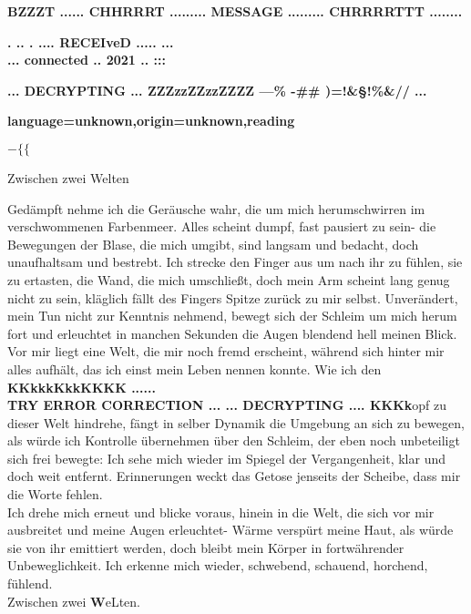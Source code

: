 \textbf{
    BZZZT ...... CHHRRRT ......... MESSAGE ......... CHRRRRTTT ........
}

\begin{center}
    \Large \textbf{. .. . .... RECEIveD ..... ...}\\
    \hspace{4cm}\small\textbf{... connected .. 2021 .. :::}
\end{center}
{\Large\textbf{... DECRYPTING ... ZZZzzZZzzZZZZ ---\% -## )=!&§!\%\&// ...}}

{\hspace{6cm}\small\textbf{language=unknown,origin=unknown,reading}}


{
    \hspace{-1.5cm}\Huge $-\{\{$
}
\begin{center}
    \huge\color{orange} Zwi\color{black}sche\color{orange}n zwei \color{red}W\color{black!70}e\color{black!60}l\color{black!50}t\color{black!30}e\color{black!10}n \color{black}
\end{center}
{

\itshape

\color{black!10}G\color{black!30}e\color{black!50}d\color{black!60}ä\color{black!70}m\color{black!80}p\color{black!90}f\color{black}t nehme ich die Geräusche wahr, die um mich herumschwirren im verschwommenen Farbenmeer. Alles scheint dumpf, fast pausiert zu sein- die Bewegungen der Blase, die mich umgibt, sind langsam und bedacht, doch unaufhaltsam und bestrebt. Ich strecke den Finger aus um nach ihr zu fühlen, sie zu ertasten, die Wand, die mich umschließt, doch mein Arm scheint lang genug nicht zu sein, kläglich fällt des Fingers Spitze zurück zu mir selbst. Unverändert, mein Tun nicht zur Kenntnis nehmend, bewegt sich der Schleim um mich herum fort und erleuchtet in manchen Sekunden die Augen blendend hell meinen Blick.  Vor mir liegt eine Welt, die mir noch fremd erscheint, während sich hinter mir alles aufhält, das ich einst mein Leben nennen konnte. Wie ich den {\normalfont\textbf{KKkkkKkkKKKK ...... }}\\

{\normalfont\textbf{TRY ERROR CORRECTION ... ...  DECRYPTING .... KKKk}}opf zu dieser Welt hindrehe, fängt in selber Dynamik die Umgebung an sich zu bewegen, als würde ich Kontrolle übernehmen über den Schleim, der eben noch unbeteiligt sich frei bewegte: Ich sehe mich wieder im Spiegel der Vergangenheit, klar und doch weit entfernt. Erinnerungen weckt das Getose jenseits der Scheibe, dass mir die Worte fehlen. \\

Ich drehe mich erneut und blicke voraus, hinein in die Welt, die sich vor mir ausbreitet und meine Augen erleuchtet- Wärme verspürt meine Haut, als würde sie von ihr emittiert werden, doch bleibt mein Körper in fortwährender Unbeweglichkeit. Ich erkenne mich wieder, schwebend, schauend, horchend, fühlend. \\

\hspace{1cm} Zwischen zwei {\normalfont\textbf{W}}eLten. 

}



